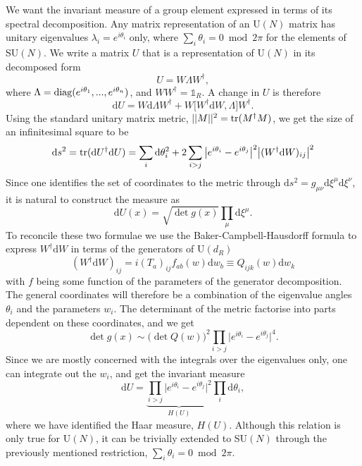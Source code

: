 We want the invariant measure of a group element expressed in terms of its
spectral decomposition. Any matrix representation of an U$(N)$ matrix has
unitary eigenvalues $\lambda_i = e^{i\theta_i}$ only, where $\sum_i \theta_i =
0 \bmod 2\pi$ for the elements of SU$(N)$. We write a matrix $U$ that is a representation
of U$(N)$ in its decomposed form
%
\begin{equation}
  U = W \Lambda W^{\dagger},
\end{equation}
%
where $\Lambda = \operatorname{diag} (e^{i\theta_1}, ..., e^{i\theta_n})$, and $W W^{\dagger}
= \mathbb{1}_R$.  A change in $U$ is therefore
%
\begin{equation}
  \mathrm{d}U = W \mathrm{d} \Lambda W^{\dagger} +  W \big[ W^{\dagger} \mathrm{d}
  W, \Lambda \big] W^{\dagger}.
\end{equation}
%
Using the standard unitary matrix metric, $||M||^2 = \operatorname{tr}(M^{\dagger} M)$, we get
the size of an infinitesimal square to be
%
\begin{equation} \label{eq-infinitesimal-group-square}
  \mathrm{d} s^2 = \operatorname{tr} (\mathrm{d} U^{\dagger} \mathrm{d} U)
  = \sum_i \mathrm{d} \theta_i^2 + 2 \sum_{i > j}
    \big|e^{i \theta_i} - e^{i\theta_j}\big|^2
    \big| (W^{\dagger} \mathrm{d} W)_{ij} \big|^2
\end{equation}
%
Since one identifies the set of coordinates to the metric through
$\mathrm{d} s^2 = g_{\mu\nu} \mathrm{d} \xi^{\mu} \mathrm{d} \xi^{\nu}$,
it is natural to construct the measure as
%
\begin{equation} \label{eq-natural-group-measure}
  \mathrm{d} U(x) = \sqrt{\det g(x)} \prod_{\mu} \mathrm{d}\xi^{\mu}.
\end{equation}
%
To reconcile these two formulae we use the Baker-Campbell-Hausdorff formula to
express $W^{\dagger} \mathrm{d} W$ in terms of the generators of U$(d_R)$
%
\begin{equation}
  (W^{\dagger} \mathrm{d} W)_{ij} = i (T_a)_{ij} f_{a b}(w) \mathrm{d} w_b
  \equiv Q_{ijk}(w) \mathrm{d} w_k
\end{equation}
%
with $f$ being some function of the parameters of the generator decomposition.
The general coordinates will therefore be a combination of the eigenvalue angles
$\theta_i$ and the parameters $w_i$. The determinant of the metric factorise
into parts dependent on these coordinates, and we get
%
\begin{equation}
  \det g(x) \sim \big(\det Q(w)\big)^2 \prod_{i>j} \big|e^{i\theta_i} -
  e^{i\theta_j}\big|^4.
\end{equation}
%
Since we are mostly concerned with the integrals over the eigenvalues only, one
can integrate out the $w_i$, and get the invariant measure
%
\begin{equation}
  \mathrm{d} U = \underbrace{\prod_{i>j} \big| e^{i\theta_i} - e^{i\theta_j} \big|^2}_{H(U)} \prod_i
  \mathrm{d} \theta_i,
\end{equation}
%
where we have identified the Haar measure, $H(U)$. Although this relation is
only true for U$(N)$, it can be trivially extended to SU$(N)$ through the
previously mentioned restriction, $\sum_i \theta_i = 0 \bmod 2\pi$.

